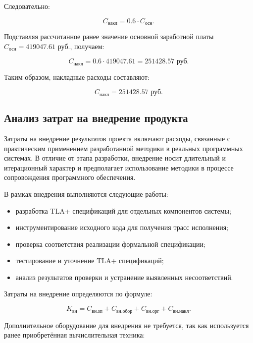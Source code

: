 Следовательно:

\begin{equation}
C_{\text{накл}} = 0.6 \cdot C_{\text{осн}}.
\end{equation}

Подставляя рассчитанное ранее значение основной заработной платы
$C_{\text{осн}} = 419047.61$ руб., получаем:

\[
C_{\text{накл}} = 0.6 \cdot 419047.61 = 251428.57 \text{ руб.}
\]

Таким образом, накладные расходы составляют:

\begin{equation}
C_{\text{накл}} = 251428.57 \text{ руб.}
\end{equation}

\subsection{Анализ затрат на внедрение продукта}

Затраты на внедрение результатов проекта включают расходы, связанные с
практическим применением разработанной методики в реальных программных
системах. В отличие от этапа разработки, внедрение носит длительный и
итерационный характер и предполагает использование методики в процессе
сопровождения программного обеспечения.

В рамках внедрения выполняются следующие работы:
\begin{itemize}
\item разработка TLA+ спецификаций для отдельных компонентов системы;
\item инструментирование исходного кода для получения трасс исполнения;
\item проверка соответствия реализации формальной спецификации;
\item тестирование и уточнение TLA+ спецификаций;
\item анализ результатов проверки и устранение выявленных несоответствий.
\end{itemize}

Затраты на внедрение определяются по формуле:

\begin{equation}
K_{\text{вн}} =
C_{\text{вн.зп}} + C_{\text{вн.обор}} +
C_{\text{вн.орг}} + C_{\text{вн.накл}}.
\end{equation}

Дополнительное оборудование для внедрения не требуется, так как
используется ранее приобретённая вычислительная техника:

